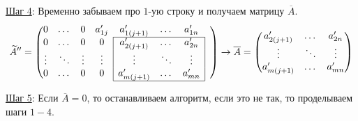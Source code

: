\documentclass[12pt]{article}
\theoremstyle{definition}
\newcommand{\wte}[1]{\widetilde{#1}}
\begin{document}
\uline{Шаг 4}: Временно забываем про $1$-ую строку и получаем матрицу $\overline{A}$.
$$
\wte{A}'' = 	
\begin{pmatrix}
	0 & \dotsc & 0 & a'_{1j} & a'_{1(j+1)} & \dotsc & a'_{1n} &\\ \cline{5-7} 
	0 & \dotsc & 0 & 0 &\multicolumn{1}{|c}{ a'_{2(j+1)} }& \dotsc & \multicolumn{1}{c|}{a'_{2n} }& \\
	\vdots & \ddots & \vdots & \vdots &\multicolumn{1}{|c}{ \vdots} & \ddots & \multicolumn{1}{c|}{\vdots} &\\ 
	0 & \dotsc & 0 & 0 & \multicolumn{1}{|c}{a'_{m(j+1)}} & \dotsc & \multicolumn{1}{c|}{a'_{mn}}& \\ \cline{5-7} 
\end{pmatrix} \to \overline{A} = 
\begin{pmatrix}
	a'_{2(j+1)} & \dotsc & a'_{2n} \\
	\vdots & \ddots & \vdots \\
	a'_{m(j+1)} & \dotsc & a'_{mn}
\end{pmatrix}
$$

\uline{Шаг 5}: Если $\overline{A} = 0$, то останавливаем алгоритм, если это не так, то проделываем шаги $1-4$.
\end{document}
